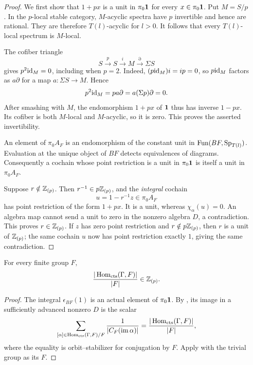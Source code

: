 \begin{proof}
We first show that $1+px$ is a unit in $\pi_0\mathbf1$ for every
$x\in\pi_0\mathbf1$.  Put $M=S/p$.  In the $p$-local stable category,
$M$-acyclic spectra have $p$ invertible and hence are rational.  They are
therefore $T(l)$-acyclic for $l>0$.  It follows that every $T(l)$-local
spectrum is $M$-local.

The cofiber triangle
\[
 S\xrightarrow{p}S\xrightarrow{i}M\xrightarrow{\partial}\Sigma S
\]
gives $p^2\mathrm{id}_M=0$, including when $p=2$.  Indeed,
$(p\mathrm{id}_M)i=ip=0$, so $p\mathrm{id}_M$ factors as $a\partial$ for a map
$a:\Sigma S\to M$.  Hence
\[
 p^2\mathrm{id}_M=p a\partial=a(\Sigma p)\partial=0.
\]
After smashing with $M$, the endomorphism $1+px$ of $\mathbf1$ thus has inverse
$1-px$.  Its cofiber is both $M$-local and $M$-acyclic, so it is zero.
This proves the asserted invertibility.

An element of $\pi_0A_F$ is an endomorphism of the constant unit in
$\operatorname{Fun}(BF,\mathrm{Sp}_{T(l)})$.  Evaluation at the unique object of $BF$ detects
equivalences of diagrams.  Consequently a cochain whose point restriction
is a unit in $\pi_0\mathbf1$ is itself a unit in $\pi_0A_F$.

Suppose $r\notin\mathbb Z_{(p)}$.  Then $r^{-1}\in p\mathbb Z_{(p)}$, and the
\emph{integral} cochain
\[
 u=1-r^{-1}z\in\pi_0A_F
\]
has point restriction of the form $1+px$.  It is a unit, whereas
$\chi_\alpha(u)=0$.  An algebra map cannot send a unit to zero in the
nonzero algebra $D$, a contradiction.  This proves $r\in\mathbb Z_{(p)}$.
If $z$ has zero point restriction and $r\notin p\mathbb Z_{(p)}$, then $r$ is a
unit of $\mathbb Z_{(p)}$; the same cochain $u$ now has point restriction exactly
$1$, giving the same contradiction.
\end{proof}

\begin{lemma}\label{lem:hom-integrality}
For every finite group $F$,
\begin{equation}\label{eq:hom-integrality}
 \frac{|\operatorname{Hom}_{\mathrm{cts}}(\Gamma,F)|}{|F|}\in\mathbb Z_{(p)}.
\end{equation}
\end{lemma}

\begin{proof}
The integral $\epsilon_{BF}(1)$ is an actual element of $\pi_0\mathbf1$.
By , its image in a sufficiently advanced
nonzero $D$ is the scalar
\[
 \sum_{[\alpha]\in\operatorname{Hom}_{\mathrm{cts}}(\Gamma,F)/F}
       \frac1{|C_F(\operatorname{im}\alpha)|}
   =\frac{|\operatorname{Hom}_{\mathrm{cts}}(\Gamma,F)|}{|F|},
\]
where the equality is orbit--stabilizer for conjugation by $F$.
Apply  with the trivial group as its $F$.
\end{proof}


